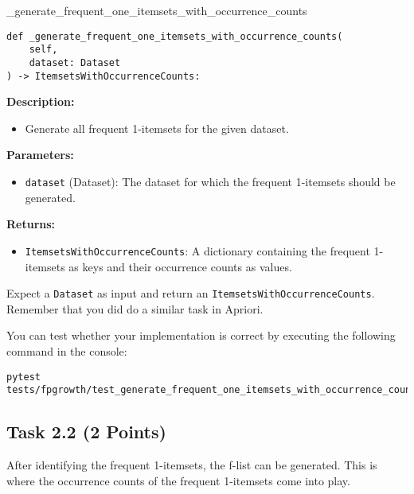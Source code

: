 \documentclass[
english,
smallborders
]{i6prcsht}
\newcommand{\points}[1]{\hfill \color{red}(#1 Points)\color{black}}
\begin{document}
\begin{functionbox}{\_generate\_frequent\_one\_itemsets\_with\_occurrence\_counts}
	\begin{lstlisting}[numbers=none]
def _generate_frequent_one_itemsets_with_occurrence_counts(
    self, 
    dataset: Dataset
) -> ItemsetsWithOccurrenceCounts:
\end{lstlisting}
	
	\textbf{Description:}
	\begin{itemize}[leftmargin=*,topsep=0pt]
		\item Generate all frequent 1-itemsets for the given dataset.
	\end{itemize}
	
	\textbf{Parameters:}
	\begin{itemize}[leftmargin=*,topsep=0pt]
		\item \texttt{dataset} (Dataset): The dataset for which the frequent 1-itemsets should be generated.
	\end{itemize}
	
	\textbf{Returns:}
	\begin{itemize}[leftmargin=*,topsep=0pt]
		\item \texttt{ItemsetsWithOccurrenceCounts}: A dictionary containing the frequent 1-itemsets as keys and their occurrence counts as values.
	\end{itemize}
\end{functionbox}

\vspace*{0.5cm}

Expect a \texttt{Dataset} as input and return an \texttt{ItemsetsWithOccurrenceCounts}. Remember that you did do a similar task in Apriori.

You can test whether your implementation is correct by executing the following command in the console:

\vspace*{0.3cm}

\begin{lstlisting}
pytest tests/fpgrowth/test_generate_frequent_one_itemsets_with_occurrence_counts.py
\end{lstlisting}

\newpage

\subsection*{Task 2.2 \points{2}}

After identifying the frequent 1-itemsets, the f-list can be generated. This is where the occurrence counts of the frequent 1-itemsets come into play.
\end{document}
